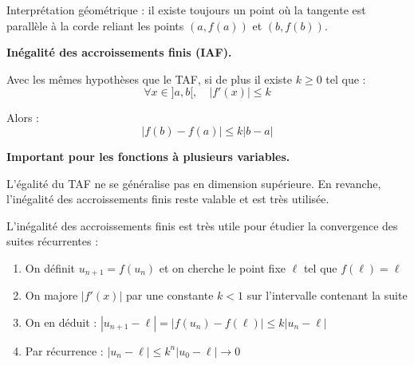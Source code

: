 \documentclass[../PolyS2.tex]{subfiles}
\begin{document}
\begin{Rmq}
Interprétation géométrique : il existe toujours un point où la tangente est parallèle à la corde reliant les points $(a, f(a))$ et $(b, f(b))$.
\end{Rmq}

\begin{Thm}
\textbf{Inégalité des accroissements finis (IAF).}

Avec les mêmes hypothèses que le TAF, si de plus il existe $k \geq 0$ tel que :
$$\forall x \in ]a, b[, \quad |f'(x)| \leq k$$

Alors :
$$|f(b) - f(a)| \leq k|b - a|$$
\end{Thm}

\begin{Rmq}
\textbf{Important pour les fonctions à plusieurs variables.}

L'égalité du TAF ne se généralise pas en dimension supérieure. En revanche, l'inégalité des accroissements finis reste valable et est très utilisée.
\end{Rmq}

\begin{Meth}
L'inégalité des accroissements finis est très utile pour étudier la convergence des suites récurrentes :
\begin{enumerate}
    \item On définit $u_{n+1} = f(u_n)$ et on cherche le point fixe $\ell$ tel que $f(\ell) = \ell$
    \item On majore $|f'(x)|$ par une constante $k < 1$ sur l'intervalle contenant la suite
    \item On en déduit : $|u_{n+1} - \ell| = |f(u_n) - f(\ell)| \leq k|u_n - \ell|$
    \item Par récurrence : $|u_n - \ell| \leq k^n |u_0 - \ell| \to 0$
\end{enumerate}
\end{Meth}
\end{document}
